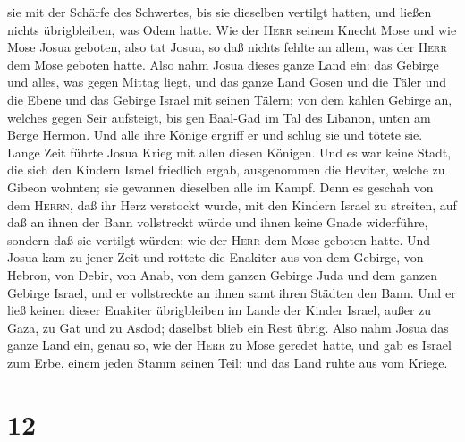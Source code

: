sie mit der Schärfe des Schwertes, bis sie dieselben vertilgt hatten,
und ließen nichts übrigbleiben, was Odem hatte.  Wie der
\textsc{Herr} seinem Knecht Mose und wie Mose Josua geboten, also tat
Josua, so daß nichts fehlte an allem, was der \textsc{Herr} dem Mose
geboten hatte.  Also nahm Josua dieses ganze Land ein:
das Gebirge und alles, was gegen Mittag liegt, und das ganze Land Gosen
und die Täler und die Ebene und das Gebirge Israel mit seinen Tälern;
 von dem kahlen Gebirge an, welches gegen Seir aufsteigt,
bis gen Baal-Gad im Tal des Libanon, unten am Berge Hermon. Und alle
ihre Könige ergriff er und schlug sie und tötete sie. 
Lange Zeit führte Josua Krieg mit allen diesen Königen. 
Und es war keine Stadt, die sich den Kindern Israel friedlich ergab,
ausgenommen die Heviter, welche zu Gibeon wohnten; sie gewannen
dieselben alle im Kampf.  Denn es geschah von dem
\textsc{Herrn}, daß ihr Herz verstockt wurde, mit den Kindern Israel zu
streiten, auf daß an ihnen der Bann vollstreckt würde und ihnen keine
Gnade widerführe, sondern daß sie vertilgt würden; wie der \textsc{Herr}
dem Mose geboten hatte.  Und Josua kam zu jener Zeit und
rottete die Enakiter aus von dem Gebirge, von Hebron, von Debir, von
Anab, von dem ganzen Gebirge Juda und dem ganzen Gebirge Israel, und er
vollstreckte an ihnen samt ihren Städten den Bann.  Und
er ließ keinen dieser Enakiter übrigbleiben im Lande der Kinder Israel,
außer zu Gaza, zu Gat und zu Asdod; daselbst blieb ein Rest übrig.
 Also nahm Josua das ganze Land ein, genau so, wie der
\textsc{Herr} zu Mose geredet hatte, und gab es Israel zum Erbe, einem
jeden Stamm seinen Teil; und das Land ruhte aus vom Kriege.

\hypertarget{section-11}{%
\section{12}\label{section-11}}

